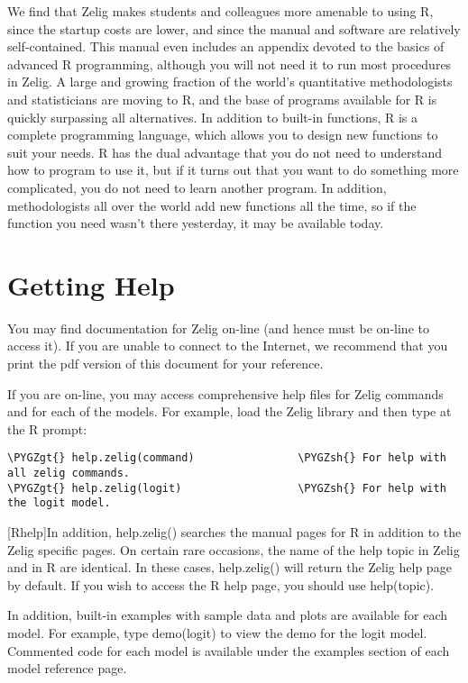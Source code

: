 \documentclass[letterpaper,10pt,english]{sphinxmanual}
\def\PYGZgt{\char`\>}
\def\PYGZsh{\char`\#}
\begin{document}
We find that Zelig makes students and colleagues more amenable to using
R, since the startup costs are lower, and since the manual and software
are relatively self-contained. This manual even includes an appendix
devoted to the basics of advanced R programming, although you will not
need it to run most procedures in Zelig. A large and growing fraction of
the world’s quantitative methodologists and statisticians are moving to
R, and the base of programs available for R is quickly surpassing all
alternatives. In addition to built-in functions, R is a complete
programming language, which allows you to design new functions to suit
your needs. R has the dual advantage that you do not need to understand
how to program to use it, but if it turns out that you want to do
something more complicated, you do not need to learn another program. In
addition, methodologists all over the world add new functions all the
time, so if the function you need wasn’t there yesterday, it may be
available today.


\section{Getting Help}
\label{1_introduction:getting-help}
You may find documentation for Zelig on-line (and hence must be on-line
to access it). If you are unable to connect to the Internet, we
recommend that you print the pdf version of this document for your
reference.

If you are on-line, you may access comprehensive help files for Zelig
commands and for each of the models. For example, load the Zelig library
and then type at the R prompt:

\begin{Verbatim}[commandchars=\\\{\}]
\PYGZgt{} help.zelig(command)                \PYGZsh{} For help with all zelig commands.
\PYGZgt{} help.zelig(logit)                  \PYGZsh{} For help with the logit model.
\end{Verbatim}

{[}Rhelp{]}In addition, help.zelig() searches the manual pages for R in
addition to the Zelig specific pages. On certain rare occasions, the
name of the help topic in Zelig and in R are identical. In these cases,
help.zelig() will return the Zelig help page by default. If you wish to
access the R help page, you should use help(topic).

In addition, built-in examples with sample data and plots are available
for each model. For example, type demo(logit) to view the demo for the
logit model. Commented code for each model is available under the
examples section of each model reference page.
\end{document}
